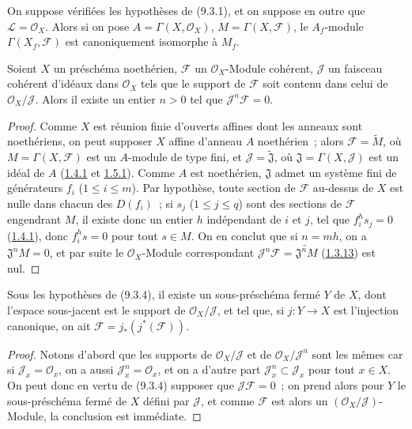 \begin{corollary}[9.3.3]
\label{I.9.3.3-fr}
On suppose vérifiées les hypothèses de (9.3.1), et on suppose en outre que
$\mathscr{L}=\mathscr{O}_X$. Alors si on pose
$A=\Gamma(X,\mathscr{O}_X)$, $M=\Gamma(X,\mathscr{F})$, le $A_f$-module
$\Gamma(X_f,\mathscr{F})$ est canoniquement isomorphe à $M_f$.
\end{corollary}

\begin{proposition}[9.3.4]
\label{I.9.3.4-fr}
Soient $X$ un préschéma noethérien, $\mathscr{F}$ un
$\mathscr{O}_X$-Module cohérent, $\mathscr{J}$ un faisceau cohérent d'idéaux
dans $\mathscr{O}_X$ tels que le support de $\mathscr{F}$ soit contenu dans
celui de $\mathscr{O}_X/\mathscr{J}$. Alors il existe un entier $n>0$ tel que
$\mathscr{J}^n\mathscr{F}=0$.
\end{proposition}

\begin{proof}
Comme $X$ est réunion finie d'ouverts affines dont les anneaux sont
noethériens, on peut supposer $X$ affine d'anneau $A$ noethérien~; alors
$\mathscr{F}=\widetilde M$, où $M=\Gamma(X,\mathscr{F})$ est un $A$-module
de type fini, et $\mathscr{J}=\widetilde{\mathfrak{J}}$, où
$\mathfrak{J}=\Gamma(X,\mathscr{J})$ est un idéal de $A$
(\hyperref[I.1.4.1-fr]{1.4.1} et \hyperref[I.1.5.1-fr]{1.5.1}). Comme $A$
est noethérien, $\mathfrak{J}$ admet un système fini de générateurs $f_i$
($1\leq i\leq m$). Par hypothèse, toute section de $\mathscr{F}$ au-dessus
de $X$ est nulle dans chacun des $D(f_i)$~; si $s_j$ ($1\leq j\leq q$) sont
des sections de $\mathscr{F}$ engendrant $M$, il existe donc un entier $h$
indépendant de $i$ et $j$, tel que $f_i^h s_j=0$
(\hyperref[I.1.4.1-fr]{1.4.1}), donc $f_i^h s=0$ pour tout $s\in M$. On en
conclut que si $n=mh$, on a $\mathfrak{J}^nM=0$, et par suite le
$\mathscr{O}_X$-Module correspondant
$\mathscr{J}^n\mathscr{F}=\widetilde{\mathfrak{J}^nM}$
(\hyperref[I.1.3.13-fr]{1.3.13}) est nul.
\end{proof}

\begin{corollary}[9.3.5]
\label{I.9.3.5-fr}
Sous les hypothèses de (9.3.4), il existe un sous-préschéma fermé $Y$ de
$X$, dont l'espace sous-jacent est le support de
$\mathscr{O}_X/\mathscr{J}$, et tel que, si $j:Y\to X$ est l'injection
canonique, on ait $\mathscr{F}=j_*(j^*(\mathscr{F}))$.
\end{corollary}

\begin{proof}
Notons d'abord que les supports de $\mathscr{O}_X/\mathscr{J}$ et de
$\mathscr{O}_X/\mathscr{J}^n$ sont les mêmes car si
$\mathscr{J}_x=\mathscr{O}_x$, on a aussi
$\mathscr{J}_x^n=\mathscr{O}_x$, et on a d'autre part
$\mathscr{J}_x^n\subset\mathscr{J}_x$ pour tout $x\in X$. On peut donc en
vertu de (9.3.4) supposer que $\mathscr{J}\mathscr{F}=0$~; on prend alors
pour $Y$ le sous-préschéma fermé de $X$ défini par $\mathscr{J}$, et comme
$\mathscr{F}$ est alors un $(\mathscr{O}_X/\mathscr{J})$-Module, la
conclusion est immédiate.
\end{proof}

